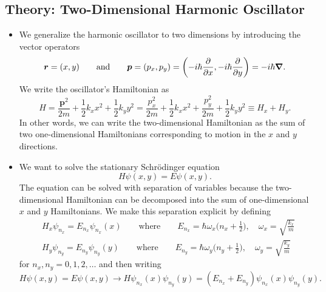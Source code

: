\documentclass[11pt, a4paper]{article}
\newcommand{\eqtext}[1]{\qquad \text{#1} \qquad}
\newcommand{\Schro}{Schr\"{o}dinger\xspace}
\renewcommand{\vec}[1]{\bm{#1}} %
\begin{document}
\subsection{Theory: Two-Dimensional Harmonic Oscillator}
\begin{itemize}
	\item We generalize the harmonic oscillator to two dimensions by introducing the vector operators
	\begin{equation*}
		\vec{r} = (x, y) \eqtext{and} \vec{p} = (p_{x}, p_{y}) = \left(-i\hbar \pdv{x}, -i \hbar \pdv{y}\right) = -i\hbar \grad.
	\end{equation*}
	We write the oscillator's Hamiltonian as
	\begin{equation*}
		H = \frac{\vec{p}^{2}}{2m} + \frac{1}{2}k_{x}x^{2} + \frac{1}{2}k_{y}y^{2} = \frac{p_{x}^{2}}{2m} + \frac{1}{2}k_{x}x^{2} + \frac{p_{y}^{2}}{2m} + \frac{1}{2}k_{y}y^{2} \equiv H_{x} + H_{y}.
	\end{equation*}
	In other words, we can write the two-dimensional Hamiltonian as the sum of two one-dimensional Hamiltonians corresponding to motion in the $ x $ and $ y $ directions. 
	
	\item We want to solve the stationary \Schro equation
	\begin{equation*}
		H \psi(x, y) = E\psi(x, y).
	\end{equation*} 
	The equation can be solved with separation of variables because the two-dimensional Hamiltonian can be decomposed into the sum of one-dimensional $ x $ and $ y $ Hamiltonians. We make this separation explicit by defining
	\begin{align*}
		&H_{x}\psi_{n_{x}} = E_{n_{x}}\psi_{n_{x}}(x) \eqtext{where} E_{n_{x}} = \hbar \omega_{x}\big(n_{x} + \tfrac{1}{2}\big), \quad \omega_{x} = \sqrt{\frac{k_{x}}{m}}\\
		&H_{y}\psi_{n_{y}} = E_{n_{y}}\psi_{n_{y}}(y) \eqtext{where} E_{n_{y}} = \hbar \omega_{y}\big(n_{y} + \tfrac{1}{2}\big), \quad \omega_{y} = \sqrt{\frac{k_{y}}{m}}
	\end{align*}
	for $ n_{x}, n_{y} = 0, 1, 2, \ldots $ and then writing
	\begin{equation*}
		H\psi(x,y) = E\psi(x, y) \to H\psi_{n_{x}}(x)\psi_{n_{y}}(y) = (E_{n_{x}} + E_{n_{y}})\psi_{n_{x}}(x)\psi_{n_{y}}(y).
	\end{equation*}
	

\end{itemize}
\end{document}
